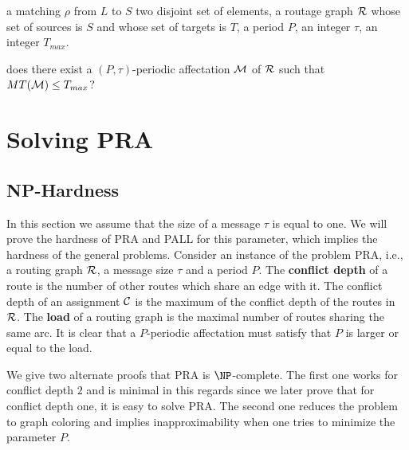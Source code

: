 \documentclass[a4paper,10pt]{article}
\begin{document}

        a matching $\rho$ from $L$ to $S$ two disjoint set of elements, a routage graph $\cal R$ whose set of sources is $S$ and whose set of targets is $T$, a period $P$, an integer $\tau$, an integer $T_{max}$.

       does there exist a $(P,\tau)$-periodic affectation ${\cal M}$ of ${\cal R}$ such that $MT({\cal M}) \leq T_{max}$?




  
\section{Solving PRA}
  \label{sec:complexity}
  \subsection{NP-Hardness}

 In this section we assume that the size of a message $\tau$ is equal to one. 
 We will prove the hardness of PRA and PALL for this parameter, which implies the hardness of the general problems. 
Consider an instance of the problem PRA, i.e., a routing graph $\cal{R}$, a message size $\tau$ and a period $P$. 
The {\bf conflict depth} of a route is the number of other routes which share an edge with it. 
The conflict depth of an assignment $\cal C$ is the maximum of the conflict depth of the routes in ${\cal R}$.
The {\bf load} of a routing graph is the maximal number of routes sharing the same arc.
It is clear that a $P$-periodic affectation must satisfy that $P$ is larger or equal to the load.

We give two alternate proofs that PRA is $\NP$-complete.
The first one works for conflict depth $2$ and is minimal in this regards since we later prove that for conflict depth one,
it is easy to solve PRA. The second one reduces the problem to graph coloring and implies inapproximability when one tries to minimize the parameter $P$. \\
\end{document}

